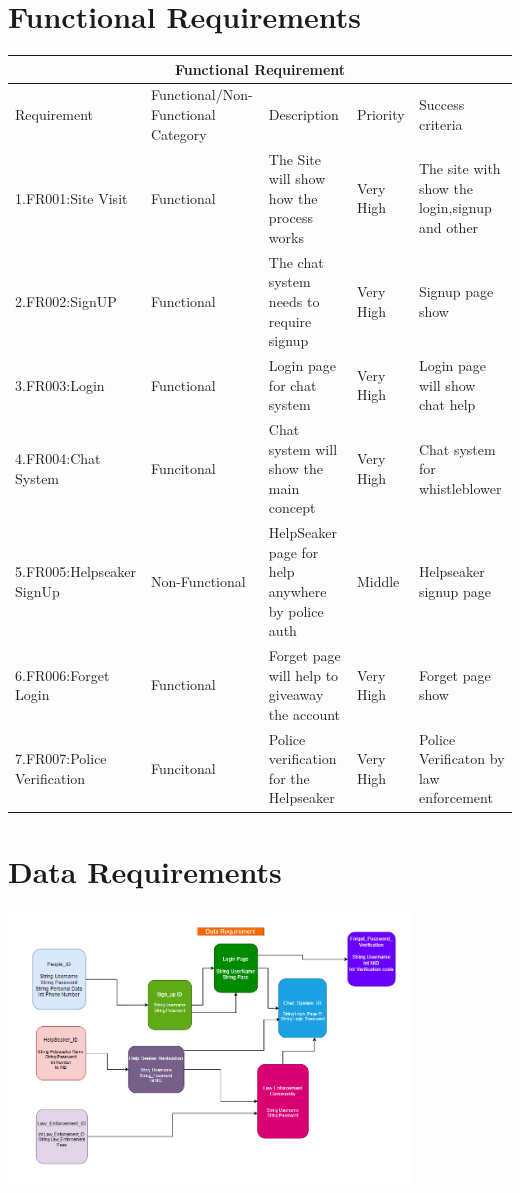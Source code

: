 \documentclass{article}
\begin{document}
\newpage
\section{Functional Requirements}

\begin{tabular}{|p{3cm}||p{3cm}|p{4cm}|p{1cm}  |p{3cm}|  }
 \hline

 \multicolumn{5}{|c|}{Functional  Requirement} \\

 \hline
Requirement&Functional/Non-Functional Category & Description & Priority & Success criteria\\
 \hline
1.FR001:Site Visit  &Functional&The Site will show how the process works&Very High&The site with show the login,signup and other\\
\hline
2.FR002:SignUP&Functional&The chat system needs to require signup&Very High&Signup page show\\
\hline
 3.FR003:Login&Functional&Login page for chat system&Very High&Login page will show chat help\\
\hline
 4.FR004:Chat System&Funcitonal&Chat system will show the main concept&Very High&Chat system for whistleblower\\
\hline
5.FR005:Helpseaker SignUp &Non-Functional&HelpSeaker page for help anywhere by police auth&Middle&Helpseaker signup page \\
\hline
 6.FR006:Forget Login & Functional&Forget page will help to giveaway the account&Very High&Forget page show\\
\hline
7.FR007:Police Verification&Funcitonal&Police verification for the Helpseaker&Very High&Police Verificaton by law enforcement\\
 \hline
\end{tabular}

\section{Data Requirements}
\includegraphics[width=0.8\textwidth]{Data_Requirement.png}
\end{document}
